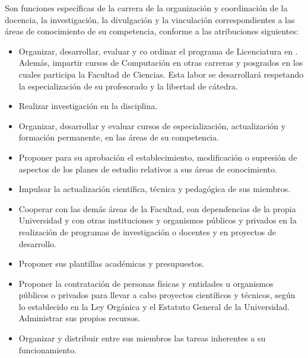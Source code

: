 Son funciones específicas de la carrera de \SchoolShortName la organización y coordinación de la docencia, la investigación, la divulgación y la vinculación correspondientes a las áreas de conocimiento de su competencia, conforme a las atribuciones siguientes: 

\begin{itemize}
\item Organizar, desarrollar, evaluar y co ordinar el programa de Licenciatura en \SchoolShortName. Además, impartir cursos de Computación en otras carreras y posgrados en los cuales participa la Facultad de Ciencias. Esta labor se desarrollará respetando la especialización de su profesorado y la libertad de cátedra. 

\item Realizar investigación en la disciplina.

\item Organizar, desarrollar y evaluar cursos de especialización, actualización y formación permanente, en las áreas de su competencia.

\item Proponer para su aprobación el establecimiento, modificación o supresión de aspectos de los planes de estudio relativos a sus áreas de conocimiento.

\item Impulsar la actualización científica, técnica y pedagógica de sus miembros.

\item Cooperar con las demás áreas de la Facultad, con dependencias de la propia Universidad y con otras instituciones y organismos públicos y privados en la realización de programas de investigación o docentes y en proyectos de desarrollo.

\item Proponer sus plantillas académicas y presupuestos.

\item Proponer la contratación de personas físicas y entidades u organismos públicos o privados para llevar a cabo proyectos científicos y técnicos, según lo establecido en la Ley Orgánica y el Estatuto General de la Universidad. Administrar sus propios recursos.

\item Organizar y distribuir entre sus miembros las tareas inherentes a su funcionamiento.
\end{itemize}
